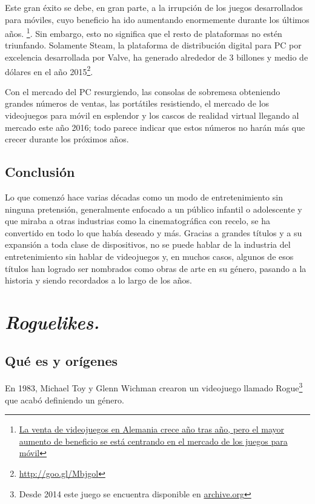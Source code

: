 Este gran éxito se debe, en gran parte, a la irrupción de los juegos desarrollados para móviles, cuyo beneficio ha ido aumentando enormemente durante los últimos años. \footnote{\href{http://goo.gl/Lz9UAa}{La venta de videojuegos en Alemania crece año tras año, pero el mayor aumento de beneficio se está centrando en el mercado de los juegos para móvil}}. Sin embargo, esto no significa que el resto de plataformas no estén triunfando. Solamente Steam, la plataforma de distribución digital para PC por excelencia desarrollada por Valve, ha generado alrededor de 3 billones y medio de dólares en el año 2015\footnote{\url{http://goo.gl/Mbjgol}}.

Con el mercado del PC resurgiendo, las consolas de sobremesa obteniendo grandes números de ventas, las portátiles resistiendo, el mercado de los videojuegos para móvil en esplendor y los cascos de realidad virtual llegando al mercado este año 2016; todo parece indicar que estos números no harán más que crecer durante los próximos años.

\subsection{Conclusión}

Lo que comenzó hace varias décadas como un modo de entretenimiento sin ninguna pretensión, generalmente enfocado a un público infantil o adolescente y que miraba a otras industrias como la cinematográfica con recelo, se ha convertido en todo lo que había deseado y más. Gracias a grandes títulos y a su expansión a toda clase de dispositivos, no se puede hablar de la industria del entretenimiento sin hablar de videojuegos y, en muchos casos, algunos de esos títulos han logrado ser nombrados como obras de arte en su género, pasando a la historia y siendo recordados a lo largo de los años.

\section{\textit{Roguelikes.}}
\label{sec:roguelikeinformacion}

\subsection{Qué es y orígenes}

En 1983, Michael Toy y Glenn Wichman crearon un videojuego llamado Rogue\footnote{Desde 2014 este juego se encuentra disponible en \href{https://archive.org/details/msdos_Rogue_1983}{archive.org}} que acabó definiendo un género.


